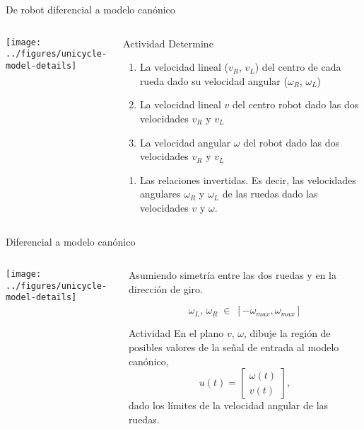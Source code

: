 \documentclass[presentation,aspectratio=169]{beamer}
\begin{document}
\begin{frame}[label={sec:org7644e02}]{De robot diferencial a modelo canónico}
\begin{columns}
\begin{column}{0.4\columnwidth}
\begin{center}
 \texttt{[image: ../figures/unicycle-model-details]}
\end{center}
\end{column}

\begin{column}{0.6\columnwidth}
\pause

\alert{Actividad} Determine

\begin{enumerate}
\item La velocidad lineal (\(v_R\), \(v_L\)) del centro de cada rueda dado su velocidad angular (\(\omega_R\), \(\omega_L\))

\item La velocidad lineal \(v\) del centro robot dado las dos velocidades \(v_R\) y \(v_L\)

\item La velocidad angular \(\omega\) del robot dado las dos velocidades \(v_R\) y \(v_L\)
\end{enumerate}


\begin{enumerate}
\item Las relaciones invertidas. Es decir, las velocidades angulares \(\omega_R\) y \(\omega_L\) de las ruedas dado las velocidades \(v\) y \(\omega\).
\end{enumerate}
\end{column}
\end{columns}
\end{frame}

\begin{frame}[label={sec:org3ccb856}]{Diferencial a modelo canónico}
\begin{columns}
\begin{column}{0.4\columnwidth}
\begin{center}
 \texttt{[image: ../figures/unicycle-model-details]}
\end{center}
\end{column}

\begin{column}{0.6\columnwidth}
Asumiendo simetría entre las dos ruedas y en la dirección de giro.

\[ \omega_L,\, \omega_R \; \in \; [-\omega_{max}, \omega_{max}]\]

\pause

\alert{Actividad}
En el plano \(v,\, \omega\),  dibuje la región de posibles valores de la señal de entrada al modelo canónico,
\[ u(t) = \begin{bmatrix} \omega(t)\\v(t) \end{bmatrix}, \]
dado los límites de la velocidad angular de las ruedas.
\end{column}
\end{columns}
\end{frame}
\end{document}
